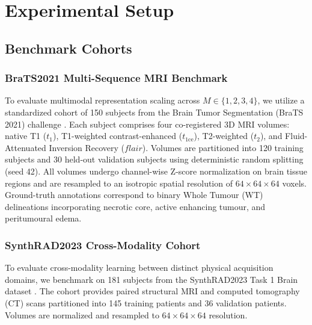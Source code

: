\section{Experimental Setup}
\label{sec:experimental_setup}

\subsection{Benchmark Cohorts}

\subsubsection{BraTS2021 Multi-Sequence MRI Benchmark}
To evaluate multimodal representation scaling across $M \in \{1, 2, 3, 4\}$, we utilize a standardized cohort of 150 subjects from the Brain Tumor Segmentation (BraTS 2021) challenge \cite{baid2021rsna,menze2014multimodal}. 
Each subject comprises four co-registered 3D MRI volumes: native T1 ($t_1$), T1-weighted contrast-enhanced ($t_{1\text{ce}}$), T2-weighted ($t_2$), and Fluid-Attenuated Inversion Recovery ($flair$). 
Volumes are partitioned into 120 training subjects and 30 held-out validation subjects using deterministic random splitting (seed 42). 
All volumes undergo channel-wise Z-score normalization on brain tissue regions and are resampled to an isotropic spatial resolution of $64 \times 64 \times 64$ voxels. 
Ground-truth annotations correspond to binary Whole Tumour (WT) delineations incorporating necrotic core, active enhancing tumour, and peritumoural edema.

\subsubsection{SynthRAD2023 Cross-Modality Cohort}
To evaluate cross-modality learning between distinct physical acquisition domains, we benchmark on 181 subjects from the SynthRAD2023 Task 1 Brain dataset \cite{thummerer2023synthrad2023}. 
The cohort provides paired structural MRI and computed tomography (CT) scans partitioned into 145 training patients and 36 validation patients. 
Volumes are normalized and resampled to $64 \times 64 \times 64$ resolution.

